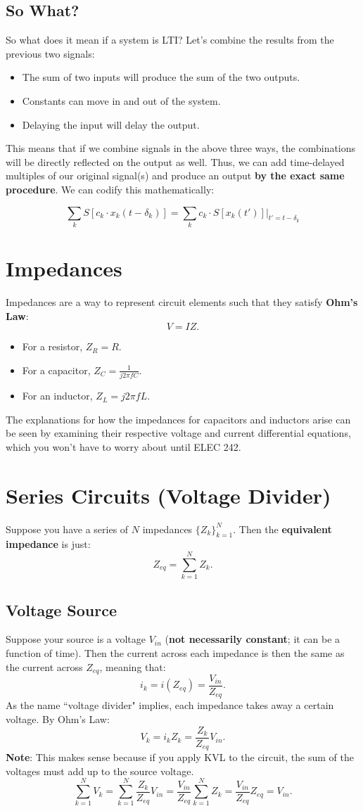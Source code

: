 \documentclass[11pt]{article}
\begin{document}
\subsection{So What?}
So what does it mean if a system is LTI? Let's combine the results from the previous two signals:
\begin{itemize}
\item The sum of two inputs will produce the sum of the two outputs.
\item Constants can move in and out of the system.
\item Delaying the input will delay the output.
\end{itemize}
This means that if we combine signals in the above three ways, the combinations will be directly reflected on the output as well. Thus, we can add time-delayed multiples of our original signal(s) and produce an output {\bf by the exact same procedure}. We can codify this mathematically:

\[ \sum_{k} S[c_k \cdot x_k(t-\delta_k)] = \sum_{k} c_k \cdot S[x_k(t')] \vert_{t'=t-\delta_k} \]

\section{Impedances}
Impedances are a way to represent circuit elements such that they satisfy {\bf Ohm's Law}:
\[ \boxed{V = IZ.} \]
\begin{itemize}
\item For a resistor, $Z_R = R$.
\item For a capacitor, $Z_C = \frac{1}{j2\pi fC}$.
\item For an inductor, $Z_L = j2\pi fL$.
\end{itemize}
The explanations for how the impedances for capacitors and inductors arise can be seen by examining their respective voltage and current differential equations, which you won't have to worry about until ELEC 242.

\section{Series Circuits (Voltage Divider)}
Suppose you have a series of $N$ impedances $\{Z_k\}_{k=1}^N$. Then the {\bf equivalent impedance} is just:
\[Z_{eq} = \sum_{k=1}^N Z_k.\]

\subsection{Voltage Source}
Suppose your source is a voltage $V_{in}$ ({\bf not necessarily constant}; it can be a function of time). Then the current across each impedance is then the same as the current across $Z_{eq}$, meaning that:
\[ i_k = i(Z_{eq}) = \frac{V_{in}}{Z_{eq}}. \]
As the name ``voltage divider" implies, each impedance takes away a certain voltage. By Ohm's Law:
\[ V_k = i_k Z_k = \frac{Z_k}{Z_{eq}}V_{in}. \]
{\bf Note}: This makes sense because if you apply KVL to the circuit, the sum of the voltages must add up to the source voltage.
\[ \sum_{k=1}^N V_k = \sum_{k=1}^N \frac{Z_k}{Z_{eq}}V_{in}  =   \frac{V_{in}}{Z_{eq}} \sum_{k=1}^N Z_k = \frac{V_{in}}{Z_{eq}} Z_{eq} = V_{in}.\]
\end{document}
